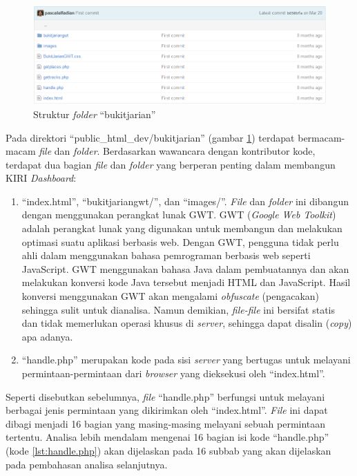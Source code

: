 \begin{figure}[htbp]
	\centering
		\includegraphics[scale=0.5]{Gambar/3_bukit_jarian.png}
	\caption{Struktur \textit{folder} ``bukitjarian''}
	\label{fig:3_bukit_jarian}
\end{figure}

Pada direktori ``public\_html\_dev/bukitjarian'' (gambar \ref{fig:3_bukit_jarian}) terdapat bermacam-macam \textit{file} dan \textit{folder}. Berdasarkan wawancara dengan kontributor kode, terdapat dua bagian \textit{file} dan \textit{folder} yang berperan penting dalam membangun KIRI \textit{Dashboard}:
\begin{enumerate}
	\item ``index.html'', ``bukitjariangwt/'', dan ``images/''. \textit{File} dan \textit{folder} ini dibangun dengan menggunakan perangkat lunak GWT. GWT (\textit{Google Web Toolkit}) adalah perangkat lunak yang digunakan untuk membangun dan melakukan optimasi suatu aplikasi berbasis web\cite{gwt}. Dengan GWT, pengguna tidak perlu ahli dalam menggunakan bahasa pemrograman berbasis web seperti JavaScript. GWT menggunakan bahasa Java dalam pembuatannya dan akan melakukan konversi kode Java tersebut menjadi HTML dan JavaScript. Hasil konversi menggunakan GWT akan mengalami \textit{obfuscate} (pengacakan) sehingga sulit untuk dianalisa. Namun demikian, \textit{file-file} ini bersifat statis dan tidak memerlukan operasi khusus di \textit{server}, sehingga dapat disalin (\textit{copy}) apa adanya. 
	\item ``handle.php'' merupakan kode pada sisi \textit{server} yang bertugas untuk melayani permintaan-permintaan dari \textit{browser} yang dieksekusi oleh ``index.html''.
\end{enumerate}

Seperti disebutkan sebelumnya, \textit{file} ``handle.php'' berfungsi untuk melayani berbagai jenis permintaan yang dikirimkan oleh ``index.html''. \textit{File} ini dapat dibagi menjadi 16 bagian yang masing-masing melayani sebuah permintaan tertentu. Analisa lebih mendalam mengenai 16 bagian isi kode ``handle.php'' (kode \ref{lst:handle.php}) akan dijelaskan pada 16 subbab yang akan dijelaskan pada pembahasan analisa selanjutnya.

